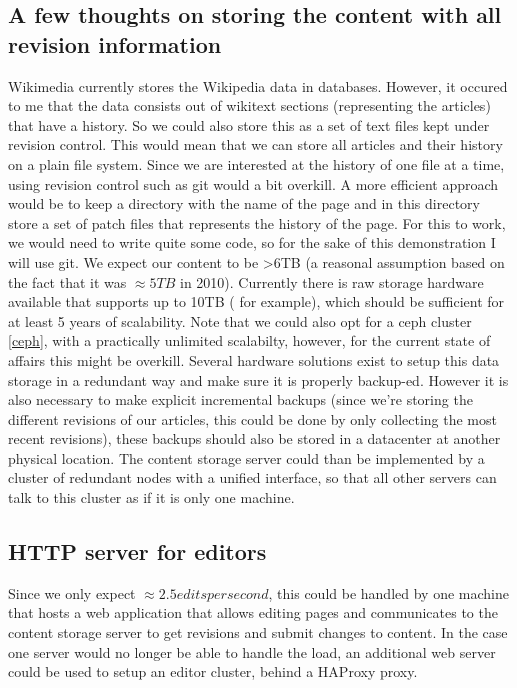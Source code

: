 \documentclass[12pt]{report}
\begin{document}
\subsection{A few thoughts on storing the content with all revision
  information}
Wikimedia currently stores the Wikipedia data in databases. However,
it occured to me that the data consists out of wikitext sections
(representing the articles) that have a history. So we could also
store this as a set of text files kept under revision control.
This would mean that we can store all articles and their history on a
plain file system.
Since we are interested at the history of one file at a time, using 
revision control such as git would a bit overkill. A more efficient
approach would be to keep a directory with the name of the page and in
this directory store a set of patch files that represents the history of the
page.
For this to work, we would need to write quite some code, so for the
sake of this demonstration I will use git.
We expect our content to be >6TB (a reasonal assumption based on
the fact that it was $\approx 5TB$ in 2010). Currently there is raw
storage hardware available that supports up to 10TB
(\cite{hp_10TB_storage} for example), which should be
sufficient for at least 5 years of scalability.
Note that we could also opt for a ceph cluster \ref{ceph}, with a
practically unlimited scalabilty, however, for the current state of
affairs this might be overkill.
Several hardware solutions exist to setup this data storage in a
redundant way and make sure it is properly backup-ed. However it is
also necessary to make explicit incremental backups (since
we're storing the different revisions of our articles, this could be
done by only collecting the most recent revisions), these backups
should also be stored in a datacenter at another physical location.
The content storage server could than be implemented by a cluster of
redundant nodes with a unified interface, so that all other servers
can talk to this cluster as if it is only one machine.

\subsection{HTTP server for editors}
Since we only expect $\approx 2.5 edits per second$, this could be
handled by one machine that hosts a web application that allows
editing pages and communicates to the content storage server to get
revisions and submit changes to content.
In the case one server would no longer be able to handle the load, an
additional web server could be used to setup an editor cluster, behind
a HAProxy proxy.
\end{document}
